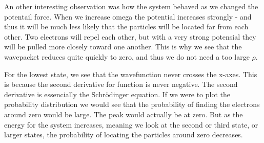 \documentclass[a4paper,12pt, english]{article}
\begin{document}
An other interesting observation was how the system behaved as we changed the potentail force. 
When we increase omega the potential increases strongly - and thus it will be much less likely that the particles will be located far from each other. Two electrons will repel each other, but with a very strong potensial they will be pulled more closely toward one another. This is why we see that the wavepacket reduces quite quickly to zero, and thus we do not need a too large $\rho$.

For the lowest state, we see that the wavefunction never crosses the x-axes. This is because the second derivative for function is never negative. The second derivative is essencially the Schr\"odinger equation. If we were to plot the probability distribution we would see that the probability of finding the electrons around zero would be large. The peak would actually be at zero. But as the energy for the system increases, meaning we look at the second or third state, or larger states, the probability of locating the particles around zero decreases. 
\end{document}
